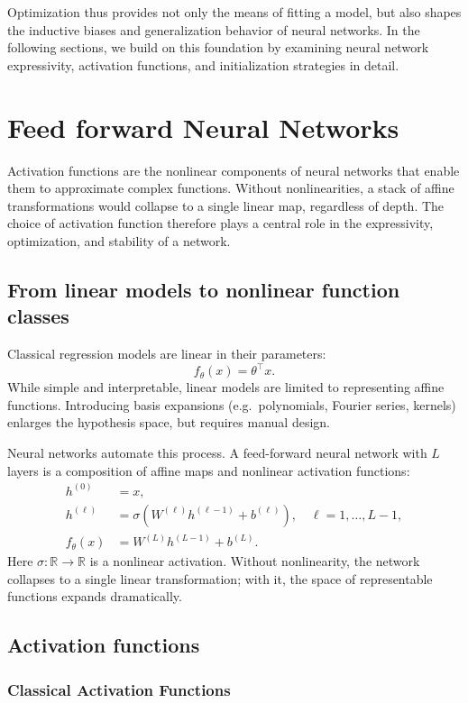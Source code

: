 Optimization thus provides not only the means of fitting a model, but also shapes the 
inductive biases and generalization behavior of neural networks. In the following sections, 
we build on this foundation by examining neural network expressivity, activation functions, 
and initialization strategies in detail.

\section{Feed forward Neural Networks}
\label{sec:FFNN}

Activation functions are the nonlinear components of neural networks that 
enable them to approximate complex functions. Without nonlinearities, 
a stack of affine transformations would collapse to a single linear map, 
regardless of depth. The choice of activation function therefore plays a 
central role in the expressivity, optimization, and stability of a network.  

\subsection{From linear models to nonlinear function classes}
Classical regression models are linear in their parameters: 
\[
  f_\theta(x) = \theta^\top x.
\]
While simple and interpretable, linear models are limited to representing 
affine functions. Introducing basis expansions (e.g.\ polynomials, Fourier series, 
kernels) enlarges the hypothesis space, but requires manual design.  

Neural networks automate this process. A feed-forward neural network with $L$ layers is 
a composition of affine maps and nonlinear activation functions:
\begin{align}
  h^{(0)} &= x, \\
  h^{(\ell)} &= \sigma\!\left(W^{(\ell)} h^{(\ell-1)} + b^{(\ell)}\right), 
  \quad \ell=1,\dots,L-1, \\
  f_\theta(x) &= W^{(L)} h^{(L-1)} + b^{(L)}.
\end{align}
Here $\sigma:\mathbb{R}\to\mathbb{R}$ is a nonlinear activation. Without nonlinearity, 
the network collapses to a single linear transformation; with it, the space of representable 
functions expands dramatically.  

\subsection{Activation functions}
\subsubsection{Classical Activation Functions}

